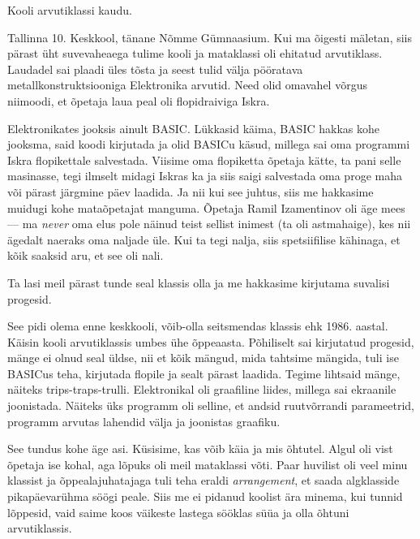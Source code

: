 


Kooli arvutiklassi kaudu.


Tallinna 10. Keskkool, tänane Nõmme 
Gümnaasium. Kui ma 
õigesti mäletan, siis pärast üht suvevaheaega tulime kooli ja 
mataklassi oli ehitatud arvutiklass. Laudadel sai plaadi üles tõsta ja seest tulid 
välja pööratava metallkonstruktsiooniga 
Elektronika arvutid. Need olid omavahel võrgus 
niimoodi, et õpetaja laua peal oli flopidraiviga 
Iskra. 

Elektronikates jooksis ainult BASIC. 
Lükkasid käima, BASIC hakkas kohe jooksma, said koodi 
kirjutada ja olid BASICu käsud, millega sai oma programmi Iskra flopikettale salvestada. Viisime oma flopiketta õpetaja kätte, ta pani selle masinasse, tegi ilmselt midagi Iskras ka ja 
siis saigi salvestada oma proge maha või pärast järgmine päev laadida. Ja nii 
kui see juhtus, siis me hakkasime muidugi kohe mataõpetajat manguma. Õpetaja 
Ramil Izamentinov oli äge 
mees --- ma \emph{never} oma elus pole näinud teist sellist inimest (ta oli astmahaige), 
kes nii ägedalt naeraks oma naljade üle. Kui 
ta tegi nalja, siis spetsiifilise kähinaga, et kõik saaksid aru, et see oli nali. 

Ta lasi meil pärast tunde seal klassis olla ja me 
hakkasime kirjutama suvalisi progesid. 


See pidi olema enne keskkooli, võib-olla seitsmendas 
klassis ehk 1986. aastal. Käisin kooli arvutiklassis 
umbes ühe õppeaasta. Põhiliselt sai kirjutatud progesid, 
mänge ei olnud seal üldse, nii et kõik mängud, mida 
tahtsime mängida, tuli ise BASICus teha, kirjutada flopile ja sealt pärast laadida. Tegime
lihtsaid mänge, näiteks trips-traps-trulli. Elektronikal oli graafiline liides, millega
sai ekraanile joonistada. Näiteks üks programm oli 
selline, et andsid ruutvõrrandi parameetrid, programm arvutas lahendid välja ja joonistas 
graafiku. 


See tundus kohe äge asi. Küsisime, kas 
võib käia ja mis õhtutel. Algul oli vist õpetaja ise kohal, 
aga lõpuks oli meil mataklassi võti. Paar huvilist 
oli veel minu klassist ja õppealajuhatajaga tuli teha eraldi \emph{arrangement}, et saada algklasside pikapäevarühma söögi 
peale. Siis me ei pidanud koolist ära minema, kui tunnid lõppesid, vaid saime koos
väikeste lastega sööklas süüa ja olla õhtuni arvutiklassis. 

